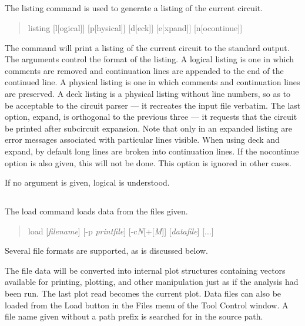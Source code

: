 \subsection{}


The {\cb listing} command is used to generate a listing of the current
circuit.
\begin{quote}\vt
listing [l[ogical]] [p[hysical]] [d[eck]] [e[xpand]] [n[ocontinue]]
\end{quote}
The command will print a listing of the current circuit to the
standard output.  The arguments control the format of the listing.  A
{\vt logical} listing is one in which comments are removed and
continuation lines are appended to the end of the continued line.  A
{\vt physical} listing is one in which comments and continuation lines
are preserved.  A {\vt deck} listing is a {\vt physical} listing
without line numbers, so as to be acceptable to the circuit parser ---
it recreates the input file verbatim.  The last option, {\vt expand},
is orthogonal to the previous three --- it requests that the circuit
be printed after subcircuit expansion.  Note that only in an expanded
listing are error messages associated with particular lines visible. 
When using {\vt deck} and {\vt expand}, by default long lines are
broken into continuation lines.  If the {\vt nocontinue} option is
also given, this will not be done.  This option is ignored in other
cases.

If no argument is given, {\vt logical} is understood.

\subsection{}


The {\cb load} command loads data from the files given.
\begin{quote}\vt
load [{\it filename\/}] [{\vt -p} {\it printfile\/}]
 [{\vt -c}{\it N\/}[{\vt +}[{\it M\/}]] [{\it datafile\/}] [...]
\end{quote}

Several file formats are supported, as is discussed below.

The file data will be converted into internal plot structures
containing vectors available for printing, plotting, and other
manipulation just as if the analysis had been run.  The last plot read
becomes the current plot.  Data files can also be loaded from the {\cb
Load} button in the {\cb Files} menu of the {\cb Tool Control} window. 
A file name given without a path prefix is searched for in the source
path.

